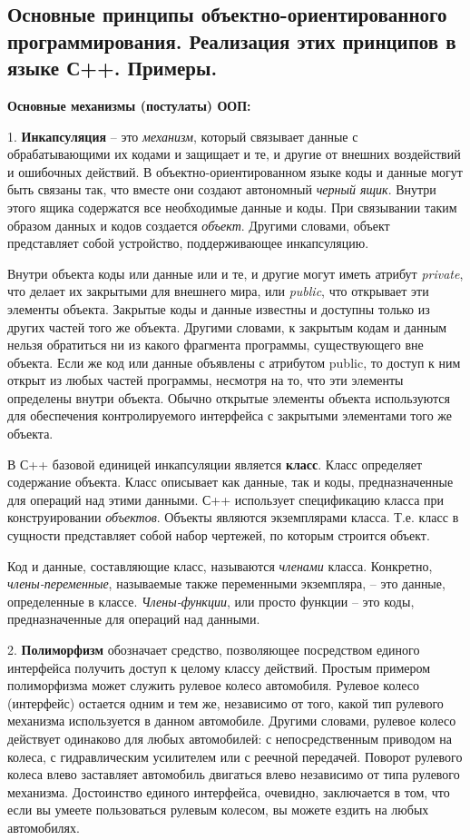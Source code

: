 \subsection{Основные принципы объектно-ориентированного программирования. Реализация этих принципов в языке С++. Примеры.}


\centerline{\textbf{Основные механизмы (постулаты) ООП:}}

1. \textbf{Инкапсуляция} -- это \textit{механизм}, который связывает данные с обрабатывающими их кодами и защищает и те, и другие от внешних воздействий и ошибочных действий. В объектно-ориентированном языке коды и данные могут быть связаны так, что вместе они создают автономный \textit{черный ящик}. Внутри этого ящика содержатся все необходимые данные и коды. При связывании таким образом данных и кодов создается \textit{объект}. Другими словами, объект представляет собой устройство, поддерживающее инкапсуляцию.
    
Внутри объекта коды или данные или и те, и другие могут иметь атрибут \textit{private}, что делает их закрытыми для внешнего мира, или \textit{public}, что открывает эти элементы объекта. Закрытые коды и данные известны и доступны только из других частей того же объекта. Другими словами, к закрытым кодам и данным нельзя обратиться ни из какого фрагмента программы, существующего вне объекта. Если же код или данные объявлены с атрибутом public, то доступ к ним открыт из любых частей программы, несмотря на то, что эти элементы определены внутри объекта. Обычно открытые элементы объекта используются для обеспечения контролируемого интерфейса с закрытыми элементами того же объекта.
    
В С++ базовой единицей инкапсуляции является \textbf{класс}. Класс определяет содержание объекта. Класс описывает как данные, так и коды, предназначенные для операций над этими данными. С++ использует спецификацию класса при конструировании \textit{объектов}. Объекты являются экземплярами класса. Т.е. класс в сущности представляет собой набор чертежей, по которым строится объект.
    
Код и данные, составляющие класс, называются \textit{членами} класса. Конкретно, \textit{члены-переменные}, называемые также переменными экземпляра, -- это данные, определенные в классе. \textit{Члены-функции}, или просто функции -- это коды, предназначенные для операций над данными.
    
2. \textbf{Полиморфизм} обозначает средство, позволяющее посредством единого интерфейса получить доступ к целому классу действий. Простым примером полиморфизма может служить рулевое колесо автомобиля. Рулевое колесо (интерфейс) остается одним и тем же, независимо от того, какой тип рулевого механизма используется в данном автомобиле. Другими словами, рулевое колесо действует одинаково для любых автомобилей: с непосредственным приводом на колеса, с гидравлическим усилителем или с реечной передачей. Поворот рулевого колеса влево заставляет автомобиль двигаться влево независимо от типа рулевого механизма. Достоинство единого интерфейса, очевидно, заключается в том, что если вы умеете пользоваться рулевым колесом, вы можете ездить на любых автомобилях.
    
